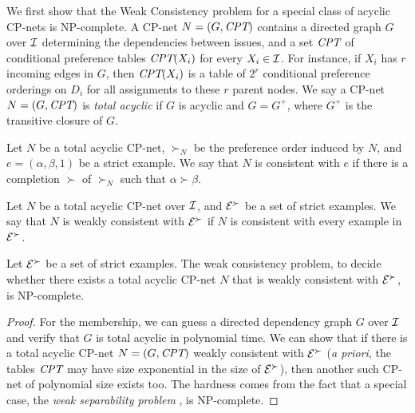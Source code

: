We first show that the Weak Consistency problem for a special class of 
acyclic CP-nets is NP-complete.
A CP-net $N=(G,\textit{CPT})$ contains a directed graph $G$ over $\mathcal{I}$ determining the
dependencies between issues, and a set $\textit{CPT}$ of conditional preference tables $\textit{CPT}(X_i)$ for
every $X_i \in \mathcal{I}$. For instance, if $X_i$ has $r$ incoming edges in $G$, then
$\textit{CPT}(X_i)$ is a table of $2^r$ conditional preference orderings on $D_i$ 
for all assignments to these $r$ parent nodes.
We say a CP-net $N=(G,\textit{CPT})$ is \emph{total acyclic} if $G$ is acyclic and
$G=G^+$, where $G^+$ is the transitive closure of $G$.

Let $N$ be a total acyclic CP-net,
$\succ_N$ be the preference order induced by $N$,
and $e=(\alpha,\beta,1)$ be a strict example.
We say that $N$ is consistent with $e$ if there is a completion $\succ$ of 
$\succ_N$ such that $\alpha \succ \beta$.
\begin{definition}
Let $N$ be a total acyclic CP-net over $\mathcal{I}$, and $\mathcal{E}^\succ$ be a set of strict examples.
We say that $N$ is weakly consistent with $\mathcal{E}^\succ$ if $N$ is consistent 
with every example in $\mathcal{E}^\succ$.
\end{definition}

\begin{thm}
Let $\mathcal{E}^\succ$ be a set of strict examples.
The weak consistency problem, to decide whether there exists
a total acyclic CP-net $N$ that is weakly consistent with $\mathcal{E}^\succ$, is NP-complete.
\end{thm}
\begin{proof}
	For the membership, we can guess a directed dependency graph $G$ over $\mathcal{I}$ and 
	verify that $G$ is total acyclic in polynomial time. We can show that if there is a total acyclic CP-net
	$N=(G,\textit{CPT})$ weakly consistent with $\mathcal{E}^\succ$ (\emph{a priori}, the tables $\textit{CPT}$
	may have size exponential in the size of $\mathcal{E}^\succ$), 
	then another such CP-net of polynomial size exists too.
	The hardness comes from the fact that a special case, the \emph{weak separability 
	problem} \cite{LangM09}, is NP-complete.
\end{proof}

